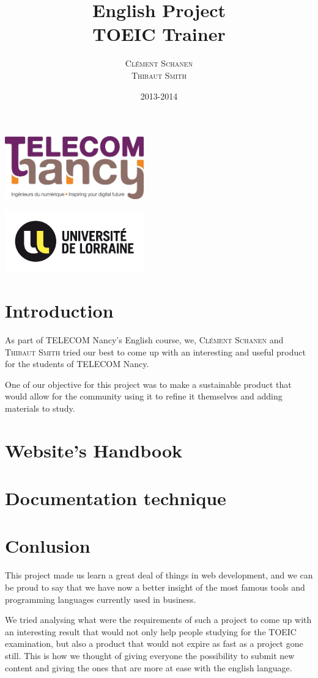 \documentclass[12pt,a4paper]{article}
\title{English Project \\ \textbf{TOEIC Trainer}}
\author{\textsc{Clément Schanen} \\ \textsc{Thibaut Smith}}
\date{2013-2014}
\makeatletter
\def\maketitle{
\begin{minipage}{0.54\textwidth}
\begin{flushleft} \large
\LARGE \@author
\end{flushleft}
\end{minipage}
\begin{minipage}{0.4\textwidth}
\begin{flushright} \large
\end{flushright}
\end{minipage}
  \vfill
  \begin{center}\leavevmode
    \normalfont
    {\LARGE \@title\par}%
    {\Large \@date\par} 
    \vskip 1cm
  \end{center}%
  \vfill
  \hfill
  
\begin{minipage}{0.54\textwidth}
\begin{flushleft} \large
\includegraphics[width=6cm]{telecomnancy.jpg}


\end{flushleft}
\end{minipage}
\begin{minipage}{0.4\textwidth}
\begin{flushright} \large
\includegraphics[width=6cm]{univ-lorraine.jpg}
\end{flushright}
\end{minipage}
  \cleardoublepage
  }
\makeatother
\begin{document}
\pagestyle{empty} %

\maketitle %

\pagestyle{plain}
\setcounter{page}{2}

\tableofcontents
\section*{Introduction}
As part of TELECOM Nancy's English course, we, \textsc{Clément Schanen} and
\textsc{Thibaut Smith} tried our best to come up with an interesting and 
useful product for the students of TELECOM Nancy.

One of our objective for this project was to make a sustainable product that
would allow for the community using it to refine it themselves and adding
materials to study.

\section{Website's Handbook}

\section{Documentation technique}

\section*{Conlusion}
This project made us learn a great deal of things in web development, and we
can be proud to say that we have now a better insight of the most famous tools
and programming languages currently used in business.
 
We tried analysing what were the requirements of such a project to come up with
an interesting result that would not only help people studying for the TOEIC
examination, but also a product that would not expire as fast as a project gone
still. This is how we thought of giving everyone the possibility to submit new
content and giving the ones that are more at ease with the english language.
\end{document}
